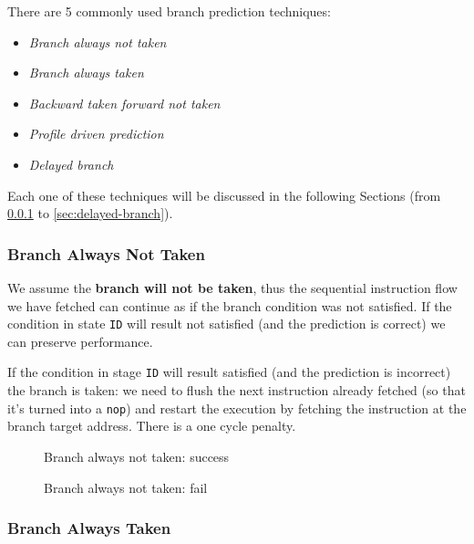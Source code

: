 \documentclass[english]{article}
\begin{document}
There are 5 commonly used branch prediction techniques:

\begin{itemize}
  \item \textit{Branch always not taken}
  \item \textit{Branch always taken}
  \item \textit{Backward taken forward not taken}
  \item \textit{Profile driven prediction}
  \item \textit{Delayed branch}
\end{itemize}

Each one of these techniques will be discussed in the following Sections (from \ref{sec:branch-always-not-taken} to \ref{sec:delayed-branch}).

\subsubsection{Branch Always Not Taken}
\label{sec:branch-always-not-taken}

We assume the \textbf{branch will not be taken}, thus the sequential instruction flow we have fetched can continue as if the branch condition was not satisfied.
If the condition in state \texttt{ID} will result not satisfied (and the prediction is correct) we can preserve performance.

If the condition in stage \texttt{ID} will result satisfied (and the prediction is incorrect) the branch is taken: we need to flush the next instruction already fetched (so that it's turned into a \texttt{nop}) and restart the execution by fetching the instruction at the branch target address.
There is a one cycle penalty.

\begin{figure}[htbp]
  \bigskip
  \centering
  \caption{Branch always not taken: success}
  \label{fig:branch-always-not-taken}
  \bigskip
\end{figure}

\begin{figure}[htbp]
  \bigskip
  \centering
  \caption{Branch always not taken: fail}
  \label{fig:branch-always-not-taken-fail}
  \bigskip
\end{figure}

\subsubsection{Branch Always Taken}
\label{sec:branch-always-taken}
\end{document}
